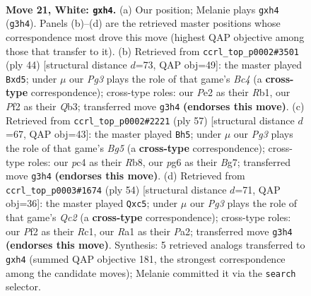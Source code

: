 \documentclass[11pt]{article}
\begin{document}
\clearpage

\begin{figure}[p]\centering
\begin{subfigure}{0.46\textwidth}\centering
\resizebox{\linewidth}{!}{%
\newchessgame
\chessboard[
  setfen={rn2k1r1/p7/b5p1/3q1p2/1Pp4b/6P1/P2BPP2/R2Q1RK1 w q - 0 21},
  showmover=false,
  pgfstyle=straightmove, color=movearrow, markmove={g3-h4}
]}
\caption{}
\end{subfigure}\hfill
\begin{subfigure}{0.46\textwidth}\centering
\resizebox{\linewidth}{!}{%
\newchessgame
\chessboard[
  setfen={1r3r1k/3q1ppp/3p4/3bp3/1PB1P3/1Q5P/3b1PP1/RR4K1 w - - 0 23},
  showmover=false,
  pgfstyle=straightmove, color=movearrow, markmove={c4-d5}
]}
\caption{}
\end{subfigure}
\\[4pt]
\begin{subfigure}{0.46\textwidth}\centering
\resizebox{\linewidth}{!}{%
\newchessgame
\chessboard[
  setfen={1r1r2k1/1q3pb1/5p2/1P1pp3/6b1/1R5B/2PQ1P1P/3NR1K1 b - - 0 29},
  showmover=false,
  pgfstyle=straightmove, color=movearrow, markmove={g4-h5}
]}
\caption{}
\end{subfigure}\hfill
\begin{subfigure}{0.46\textwidth}\centering
\resizebox{\linewidth}{!}{%
\newchessgame
\chessboard[
  setfen={1r4k1/5rp1/p2q4/2nPpp1p/8/5P2/P1Q3PP/2RR2K1 w - - 0 28},
  showmover=false,
  pgfstyle=straightmove, color=movearrow, markmove={c2-c5}
]}
\caption{}
\end{subfigure}
\caption{\textbf{Move 21, White: \texttt{gxh4}.} (a) Our position; Melanie plays \texttt{gxh4} (\texttt{g3h4}). Panels (b)--(d) are the retrieved master positions whose correspondence most drove this move (highest QAP objective among those that transfer to it). (b) Retrieved from \texttt{ccrl\_top\_p0002\#3501} (ply 44) [structural distance $d$=73, QAP obj=49]: the master played \texttt{Bxd5}; under $\mu$ our \emph{Pg3} plays the role of that game's \emph{Bc4} (a \textbf{cross-type} correspondence); cross-type roles: our \emph{P}e2 as their \emph{R}b1, our \emph{P}f2 as their \emph{Q}b3; transferred move \texttt{g3h4} \textbf{(endorses this move)}. (c) Retrieved from \texttt{ccrl\_top\_p0002\#2221} (ply 57) [structural distance $d$=67, QAP obj=43]: the master played \texttt{Bh5}; under $\mu$ our \emph{Pg3} plays the role of that game's \emph{Bg5} (a \textbf{cross-type} correspondence); cross-type roles: our \emph{p}c4 as their \emph{R}b8, our \emph{p}g6 as their \emph{B}g7; transferred move \texttt{g3h4} \textbf{(endorses this move)}. (d) Retrieved from \texttt{ccrl\_top\_p0003\#1674} (ply 54) [structural distance $d$=71, QAP obj=36]: the master played \texttt{Qxc5}; under $\mu$ our \emph{Pg3} plays the role of that game's \emph{Qc2} (a \textbf{cross-type} correspondence); cross-type roles: our \emph{P}f2 as their \emph{R}c1, our \emph{R}a1 as their \emph{P}a2; transferred move \texttt{g3h4} \textbf{(endorses this move)}. Synthesis: 5 retrieved analogs transferred to \texttt{gxh4} (summed QAP objective 181, the strongest correspondence among the candidate moves); Melanie committed it via the \texttt{search} selector.}
\label{fig:thought-m40}
\end{figure}
\end{document}

